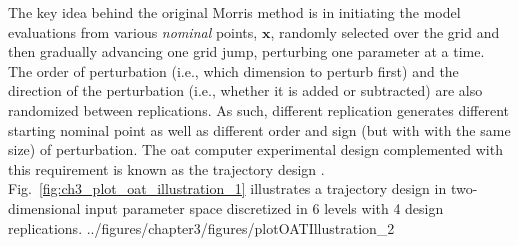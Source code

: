 The key idea behind the original Morris method is in initiating the model evaluations from various \textit{nominal} points, $\mathbf{x}$,
randomly selected over the grid and then gradually advancing one grid jump, perturbing one parameter at a time.
The order of perturbation (i.e., which dimension to perturb first) and the direction of the perturbation (i.e., whether it is added or subtracted) are also randomized between replications.
As such, different replication generates different starting nominal point as well as different order and sign (but with with the same size) of perturbation.
The \gls{oat} computer experimental design complemented with this requirement is known as the trajectory design \cite{Ruano2012}.
Fig.~\ref{fig:ch3_plot_oat_illustration_1} illustrates a trajectory design in two-dimensional input parameter space discretized in $6$ levels with 4 design replications.
{../figures/chapter3/figures/plotOATIllustration_2}

